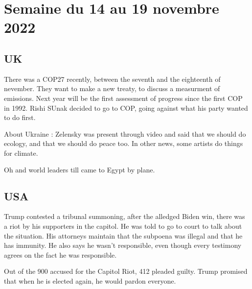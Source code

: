 \documentclass[a4paper,12pt]{book}
\begin{document}
\section{Semaine du 14 au 19 novembre 2022}
\subsection{UK}
There was a COP27 recently, between the seventh and the eighteenth of nevember. They want to make a new treaty, to discuss a measurment of emissions. Next year will be the first assessment of progress since the first COP in 1992. Rishi SUnak decided to go to COP, going against what his party wanted to do first.
\par About Ukraine : Zelensky was present through video and said that we should do ecology, and that we should do peace too. In other news, some artists do things for climate. \par Oh and world leaders till came to Egypt by plane.

\subsection{USA}
Trump contested a tribunal summoning, after the alledged Biden win, there was a riot by his supporters in the capitol. He was told to go to court to talk about the situation. His attorneys maintain that the subpoena was illegal and that he has immunity. He also says he wasn't responsible, even though every testimony agrees on the fact he was responsible.
\par Out of the 900 accused for the Capitol Riot, 412 pleaded guilty. Trump promised that when he is elected again, he would pardon everyone.
\end{document}
